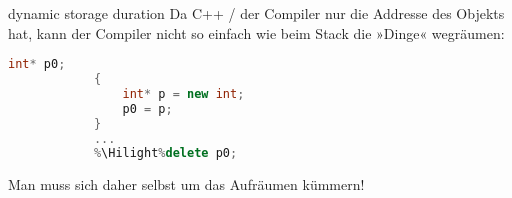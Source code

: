 \begin{frame}[fragile]{dynamic storage duration}
	Da C++ / der Compiler nur die Addresse des Objekts hat, kann der Compiler nicht so einfach wie beim Stack die »Dinge« wegräumen:
	
	{\footnotesize
	\begin{block}{}
		\begin{lstlisting}[language=C++, escapechar=\%]
			int* p0;
			{
			    int* p = new int;
			    p0 = p;
			}
			...
			%\Hilight%delete p0;
		\end{lstlisting}
	\end{block}
	}
	
	Man muss sich daher selbst um das Aufräumen kümmern!
\end{frame}
